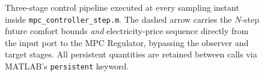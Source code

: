 \begin{figure}[htbp]
{%
	}
	\caption{Three-stage control pipeline executed at every sampling instant
		inside \texttt{mpc\_controller\_step.m}.  The dashed arrow carries the
		$N$-step future comfort bounds \emph{and} electricity-price sequence
		directly from the input port to the MPC Regulator, bypassing the
		observer and target stages.  All persistent quantities are retained
		between calls via MATLAB's \texttt{persistent} keyword.}
	\label{fig:control_pipeline}
\end{figure}

